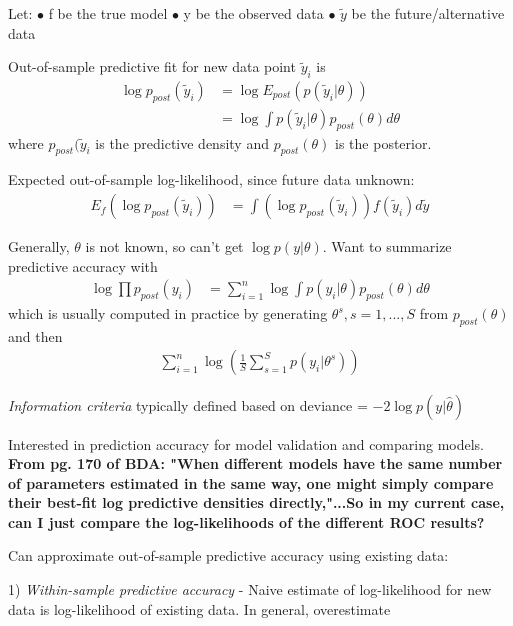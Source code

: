 \documentclass[11pt]{labbook}
\begin{document}
Let:\newline
$\bullet$ f be the true model \newline
$\bullet$ y be the observed data \newline
$\bullet$ $\tilde{y}$ be the future/alternative data

Out-of-sample predictive fit for new data point $\tilde{y}_i$ is
\begin{align*}
\log{p_{post}(\tilde{y}_i)} &= \log{E_{post}(p(\tilde{y}_i|\theta))}\\
&= \log{\int p(\tilde{y}_i|\theta)p_{post}(\theta)d\theta}
\end{align*}
where $p_{post}(\tilde{y}_i$ is the predictive density and $p_{post}(\theta)$ is the posterior. 

Expected out-of-sample log-likelihood, since future data unknown:
\begin{align*}
E_f(\log{p_{post}(\tilde{y}_i)}) &= \int(\log{p_{post}(\tilde{y}_i)})f(\tilde{y}_i)d\tilde{y}
\end{align*}

Generally, $\theta$ is not known, so can't get $\log{p(y|\theta)}$. Want to summarize predictive accuracy with
\begin{align*}
\log{\prod p_{post}(y_i)} &= \sum_{i=1}^n \log{\int p(y_i|\theta)p_{post}(\theta)d\theta}
\end{align*} 
which is usually computed in practice by generating $\theta^s, s = 1,...,S$ from $p_{post}(\theta)$ and then
\begin{align*}
\sum_{i=1}^n \log{\left(\frac{1}{S} \sum_{s=1}^S p(y_i|\theta^s)\right)}
\end{align*}


\textit{Information criteria} typically defined based on deviance = $-2\log{p(y|\hat{\theta})}$ 

Interested in prediction accuracy for model validation and comparing models. \textbf{From pg. 170 of BDA: "When different models have the same number of parameters estimated in the same way, one might simply compare their best-fit log predictive densities directly,"...So in my current case, can I just compare the log-likelihoods of the different ROC results?}

Can approximate out-of-sample predictive accuracy using existing data:

1) \textit{Within-sample predictive accuracy} - Naive estimate of log-likelihood for new data is log-likelihood of existing data. In general, overestimate
\end{document}
